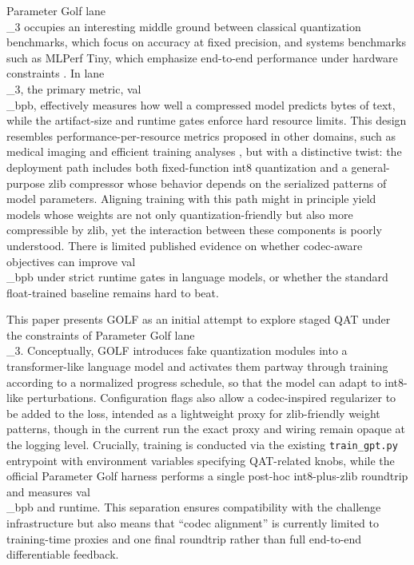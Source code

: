 \documentclass{article}
\begin{document}
Parameter Golf lane\\_3 occupies an interesting middle ground between classical quantization benchmarks, which focus on accuracy at fixed precision, and systems benchmarks such as MLPerf Tiny, which emphasize end-to-end performance under hardware constraints \cite{banbury2021mlperf}. In lane\\_3, the primary metric, val\\_bpb, effectively measures how well a compressed model predicts bytes of text, while the artifact-size and runtime gates enforce hard resource limits. This design resembles performance-per-resource metrics proposed in other domains, such as medical imaging \cite{selvan2024pepr} and efficient training analyses \cite{desislavov2021compute}, but with a distinctive twist: the deployment path includes both fixed-function int8 quantization and a general-purpose zlib compressor whose behavior depends on the serialized patterns of model parameters. Aligning training with this path might in principle yield models whose weights are not only quantization-friendly but also more compressible by zlib, yet the interaction between these components is poorly understood. There is limited published evidence on whether codec-aware objectives can improve val\\_bpb under strict runtime gates in language models, or whether the standard float-trained baseline remains hard to beat.

This paper presents GOLF as an initial attempt to explore staged QAT under the constraints of Parameter Golf lane\\_3. Conceptually, GOLF introduces fake quantization modules into a transformer-like language model and activates them partway through training according to a normalized progress schedule, so that the model can adapt to int8-like perturbations. Configuration flags also allow a codec-inspired regularizer to be added to the loss, intended as a lightweight proxy for zlib-friendly weight patterns, though in the current run the exact proxy and wiring remain opaque at the logging level. Crucially, training is conducted via the existing \texttt{train\_gpt.py} entrypoint with environment variables specifying QAT-related knobs, while the official Parameter Golf harness performs a single post-hoc int8-plus-zlib roundtrip and measures val\\_bpb and runtime. This separation ensures compatibility with the challenge infrastructure but also means that ``codec alignment'' is currently limited to training-time proxies and one final roundtrip rather than full end-to-end differentiable feedback.
\end{document}
